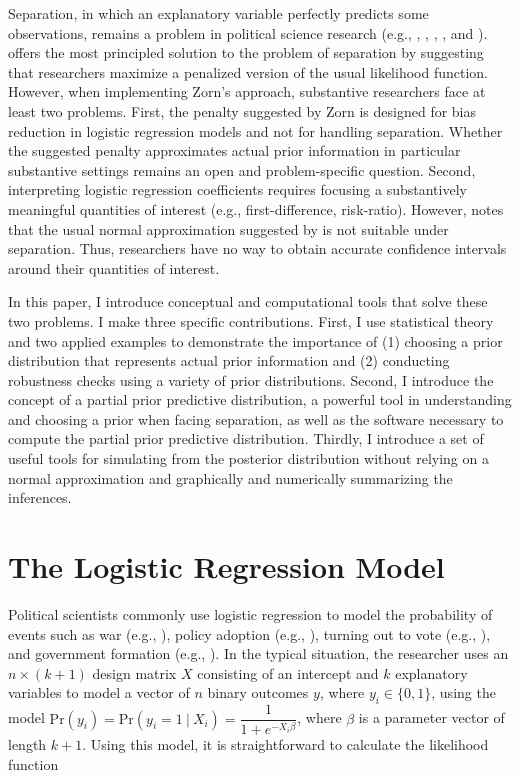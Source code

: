 \documentclass[12pt]{article}
\begin{document}
Separation, in which an explanatory variable perfectly predicts some observations, remains a problem in political science research (e.g.,  \citealt{BarrilleauxRainey2014},  \citealt{BellMiller2014}, \citealt{LeemanMares2014}, \citealt{Reiter2014}, and \citealt{Weisiger2014}). \cite{Zorn2005} offers the most principled solution to the problem of separation by suggesting that researchers maximize a penalized version of the usual likelihood function. However, when implementing Zorn's approach, substantive researchers face at least two problems. First, the penalty suggested by Zorn is designed for bias reduction in logistic regression models and not for handling separation. Whether the suggested penalty approximates actual prior information in particular substantive settings remains an open and problem-specific question. Second, interpreting logistic regression coefficients requires focusing a substantively meaningful quantities of interest (e.g., first-difference, risk-ratio). However, \cite{Zorn2005} notes that the usual normal approximation suggested by \cite{KingTomzWittenberg2000} is not suitable under separation. Thus, researchers have no way to obtain accurate confidence intervals around their quantities of interest.

In this paper, I introduce  conceptual and computational tools that solve these two problems. I make three specific contributions. First, I use statistical theory and two applied examples to demonstrate the importance of (1) choosing a prior distribution that represents actual prior information and (2) conducting robustness checks using a variety of prior distributions. Second, I introduce the concept of a partial prior predictive distribution, a powerful tool in understanding and choosing a prior when facing separation, as well as the software necessary to compute the partial prior predictive distribution. Thirdly, I introduce a set of useful tools for simulating from the posterior distribution without relying on a normal approximation and graphically and numerically summarizing the inferences.

\section*{The Logistic Regression Model}

Political scientists commonly use logistic regression to model the probability of events such as war (e.g., \citealt{Fearon1994}), policy adoption (e.g., \citealt{BerryBerry1990}), turning out to vote (e.g., \citealt{WolfingerRosenstone1980}), and government formation (e.g., \citealt{MartinStevenson2001}). In the typical situation, the researcher uses an $n \times (k + 1)$ design matrix $X$ consisting of an intercept and $k$ explanatory variables to model a vector of $n$ binary outcomes $y$, where $y_i \in \{0, 1\}$, using the model $\text{Pr}(y_i) = \text{Pr}(y_i = 1~|~ X_i) = \dfrac{1}{1 + e^{-X_i\beta}}$, where $\beta$ is a parameter vector of length $k + 1$. Using this model, it is straightforward to calculate the likelihood function 
\end{document}
